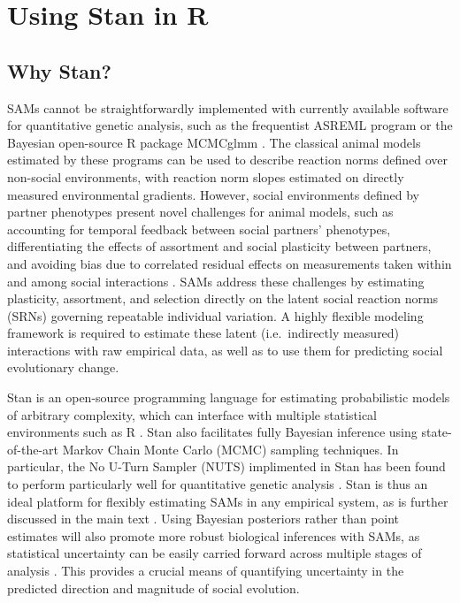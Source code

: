 \documentclass[
]{book}
\begin{document}
\hypertarget{using-stan-in-r}{%
\chapter{Using Stan in R}\label{using-stan-in-r}}

\hypertarget{why-stan}{%
\section{Why Stan?}\label{why-stan}}

SAMs cannot be straightforwardly implemented with currently available software for quantitative genetic analysis, such as the frequentist ASREML program \citep{ASREML} or the Bayesian open-source R package MCMCglmm \citep{MCMCglmm}. The classical animal models estimated by these programs can be used to describe reaction norms defined over non-social environments, with reaction norm slopes estimated on directly measured environmental gradients. However, social environments defined by partner phenotypes present novel challenges for animal models, such as accounting for temporal feedback between social partners' phenotypes, differentiating the effects of assortment and social plasticity between partners, and avoiding bias due to correlated residual effects on measurements taken within and among social interactions \citep{SAM}. SAMs address these challenges by estimating plasticity, assortment, and selection directly on the latent social reaction norms (SRNs) governing repeatable individual variation. A highly flexible modeling framework is required to estimate these latent (i.e.~indirectly measured) interactions with raw empirical data, as well as to use them for predicting social evolutionary change.

Stan \citep{Stan} is an open-source programming language for estimating probabilistic models of arbitrary complexity, which can interface with multiple statistical environments such as R \citep{Rbase}. Stan also facilitates fully Bayesian inference using state-of-the-art Markov Chain Monte Carlo (MCMC) sampling techniques. In particular, the No U-Turn Sampler (NUTS) implimented in Stan has been found to perform particularly well for quantitative genetic analysis \citep{MCMCperf}. Stan is thus an ideal platform for flexibly estimating SAMs in any empirical system, as is further discussed in the main text \citep{SAM}. Using Bayesian posteriors rather than point estimates will also promote more robust biological inferences with SAMs, as statistical uncertainty can be easily carried forward across multiple stages of analysis \citep{Stinchcombe2014}. This provides a crucial means of quantifying uncertainty in the predicted direction and magnitude of social evolution.
\end{document}
